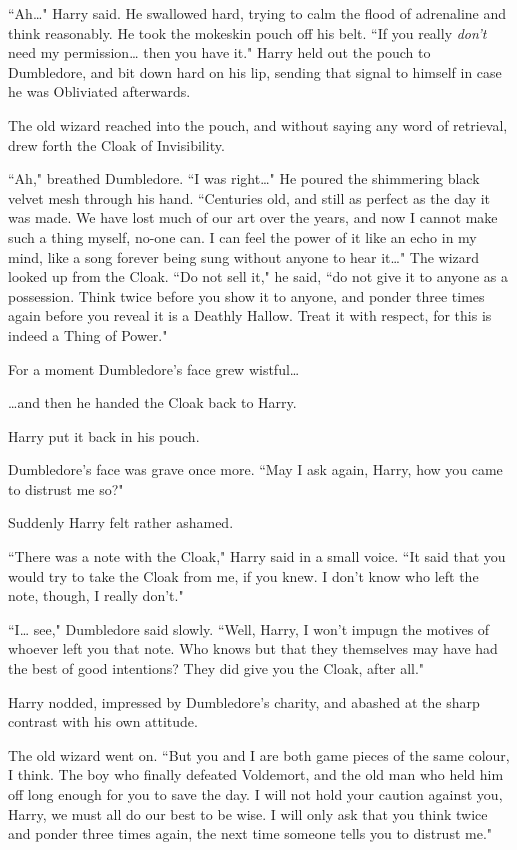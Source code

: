 ``Ah{\ldots}" Harry said. He swallowed hard, trying to calm the flood of adrenaline and think reasonably. He took the mokeskin pouch off his belt. ``If you really \emph{don't} need my permission{\ldots} then you have it." Harry held out the pouch to Dumbledore, and bit down hard on his lip, sending that signal to himself in case he was Obliviated afterwards.

The old wizard reached into the pouch, and without saying any word of retrieval, drew forth the Cloak of Invisibility.

``Ah," breathed Dumbledore. ``I was right{\ldots}" He poured the shimmering black velvet mesh through his hand. ``Centuries old, and still as perfect as the day it was made. We have lost much of our art over the years, and now I cannot make such a thing myself, no-one can. I can feel the power of it like an echo in my mind, like a song forever being sung without anyone to hear it{\ldots}" The wizard looked up from the Cloak. ``Do not sell it," he said, ``do not give it to anyone as a possession. Think twice before you show it to anyone, and ponder three times again before you reveal it is a Deathly Hallow. Treat it with respect, for this is indeed a Thing of Power."

For a moment Dumbledore's face grew wistful{\ldots}

{\ldots}and then he handed the Cloak back to Harry.

Harry put it back in his pouch.

Dumbledore's face was grave once more. ``May I ask again, Harry, how you came to distrust me so?"

Suddenly Harry felt rather ashamed.

``There was a note with the Cloak," Harry said in a small voice. ``It said that you would try to take the Cloak from me, if you knew. I don't know who left the note, though, I really don't."

``I{\ldots} see," Dumbledore said slowly. ``Well, Harry, I won't impugn the motives of whoever left you that note. Who knows but that they themselves may have had the best of good intentions? They did give you the Cloak, after all."

Harry nodded, impressed by Dumbledore's charity, and abashed at the sharp contrast with his own attitude.

The old wizard went on. ``But you and I are both game pieces of the same colour, I think. The boy who finally defeated Voldemort, and the old man who held him off long enough for you to save the day. I will not hold your caution against you, Harry, we must all do our best to be wise. I will only ask that you think twice and ponder three times again, the next time someone tells you to distrust me."

